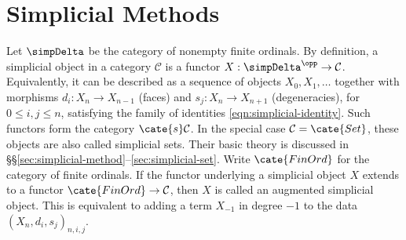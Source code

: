 

\chapter{Simplicial Methods}\label{sec:simplicial}
\hypertarget{o014.aljabr2.chapter8.simplicial-objects}{ }
Let $\simpDelta$ be the category of nonempty finite ordinals. By definition,
a simplicial object in a category $\mathcal{C}$ is a functor
$X:\simpDelta^{\opp}\to\mathcal{C}$. Equivalently, it can be described as a
sequence of objects $X_0,X_1,\ldots$ together with morphisms
$d_i:X_n\to X_{n-1}$ (faces) and $s_j:X_n\to X_{n+1}$ (degeneracies), for
$0\leq i,j\leq n$, satisfying the family of identities
\eqref{eqn:simplicial-identity}. Such functors form the category
$\cate{s}\mathcal{C}$. In the special case $\mathcal{C}=\cate{Set}$, these
objects are also called simplicial sets. Their basic theory is discussed in
\S\S\ref{sec:simplicial-method}--\ref{sec:simplicial-set}. Write
$\cate{FinOrd}$ for the category of finite ordinals. If the functor underlying
a simplicial object $X$ extends to a functor
$\cate{FinOrd}\to\mathcal{C}$, then $X$ is called an augmented simplicial
object. This is equivalent to adding a term $X_{-1}$ in degree $-1$ to the
data $(X_n,d_i,s_j)_{n,i,j}$.

